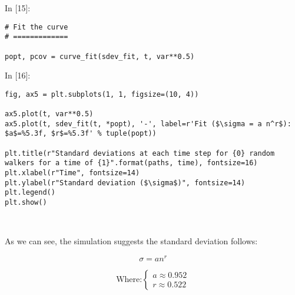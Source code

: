 \documentclass[11pt]{article}
\newif\ifcode
\newif\ifleftmargins
\newlength{\promptlength}
\newcommand{\prompt}[3]{
        \needspace{1.1cm}
        \settowidth{\promptlength}{ #1 [#3] }
        \ifleftmargins\hspace{-\promptlength}\hspace{-5pt}\fi
        {\color{#2}#1 [#3]:}
        \ifleftmargins\vspace{-2.7ex}\fi
    }
\begin{document}
    
\prompt{In}{incolor}{15}
\codetrue
\begin{tcolorbox}[breakable, size=fbox, boxrule=1pt, pad at break*=1mm, colback=cellbackground, colframe=cellborder]
\begin{verbatim}
# Fit the curve
# =============

popt, pcov = curve_fit(sdev_fit, t, var**0.5)
\end{verbatim}
\end{tcolorbox}
\codefalse

    
\prompt{In}{incolor}{16}
\codetrue
\begin{tcolorbox}[breakable, size=fbox, boxrule=1pt, pad at break*=1mm, colback=cellbackground, colframe=cellborder]
\begin{verbatim}
fig, ax5 = plt.subplots(1, 1, figsize=(10, 4))

ax5.plot(t, var**0.5)
ax5.plot(t, sdev_fit(t, *popt), '-', label=r'Fit ($\sigma = a n^r$): $a$=%5.3f, $r$=%5.3f' % tuple(popt))

plt.title(r"Standard deviations at each time step for {0} random walkers for a time of {1}".format(paths, time), fontsize=16)    
plt.xlabel(r"Time", fontsize=14)
plt.ylabel(r"Standard deviation ($\sigma$)", fontsize=14)
plt.legend()
plt.show()
\end{verbatim}
\end{tcolorbox}
\codefalse

    \begin{center}
    \end{center}
    { \hspace*{\fill} \\}
    
    As we can see, the simulation suggests the standard deviation follows:

\[\sigma = an^r\]

\[\text{Where:} 
  \left\{ \begin{array}{ll}
      a \approx 0.952 \\
      r \approx 0.522
  \end{array} \right.\]


    
    
    
    
\end{document}
